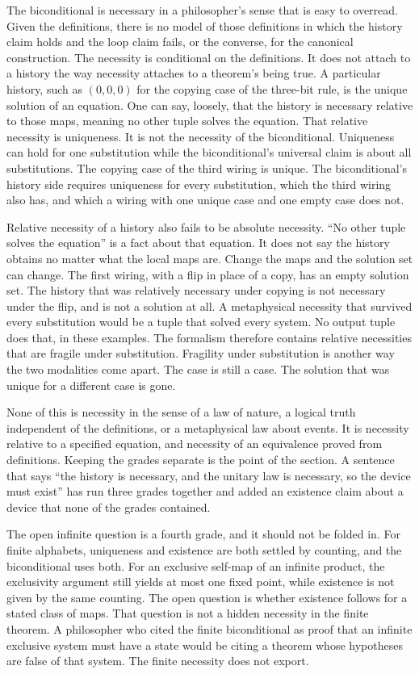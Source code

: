 \documentclass[11pt]{article}
\begin{document}
The biconditional is necessary in a philosopher's sense that is easy to overread. Given the definitions, there is no model of those definitions in which the history claim holds and the loop claim fails, or the converse, for the canonical construction. The necessity is conditional on the definitions. It does not attach to a history the way necessity attaches to a theorem's being true. A particular history, such as \((0,0,0)\) for the copying case of the three-bit rule, is the unique solution of an equation. One can say, loosely, that the history is necessary relative to those maps, meaning no other tuple solves the equation. That relative necessity is uniqueness. It is not the necessity of the biconditional. Uniqueness can hold for one substitution while the biconditional's universal claim is about all substitutions. The copying case of the third wiring is unique. The biconditional's history side requires uniqueness for every substitution, which the third wiring also has, and which a wiring with one unique case and one empty case does not.

Relative necessity of a history also fails to be absolute necessity. ``No other tuple solves the equation'' is a fact about that equation. It does not say the history obtains no matter what the local maps are. Change the maps and the solution set can change. The first wiring, with a flip in place of a copy, has an empty solution set. The history that was relatively necessary under copying is not necessary under the flip, and is not a solution at all. A metaphysical necessity that survived every substitution would be a tuple that solved every system. No output tuple does that, in these examples. The formalism therefore contains relative necessities that are fragile under substitution. Fragility under substitution is another way the two modalities come apart. The case is still a case. The solution that was unique for a different case is gone.

None of this is necessity in the sense of a law of nature, a logical truth independent of the definitions, or a metaphysical law about events. It is necessity relative to a specified equation, and necessity of an equivalence proved from definitions. Keeping the grades separate is the point of the section. A sentence that says ``the history is necessary, and the unitary law is necessary, so the device must exist'' has run three grades together and added an existence claim about a device that none of the grades contained.

The open infinite question is a fourth grade, and it should not be folded in. For finite alphabets, uniqueness and existence are both settled by counting, and the biconditional uses both. For an exclusive self-map of an infinite product, the exclusivity argument still yields at most one fixed point, while existence is not given by the same counting. The open question is whether existence follows for a stated class of maps. That question is not a hidden necessity in the finite theorem. A philosopher who cited the finite biconditional as proof that an infinite exclusive system must have a state would be citing a theorem whose hypotheses are false of that system. The finite necessity does not export.
\end{document}
